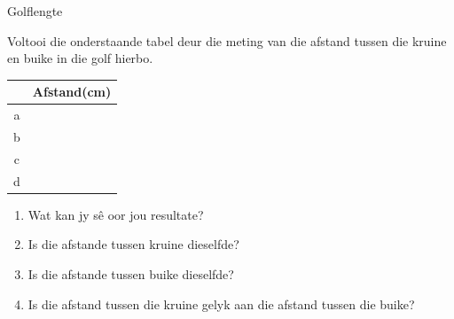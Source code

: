 \noindent
\label{m38806*secfhsst!!!underscore!!!id221}
            \begin{activity}{Golflengte}
            \nopagebreak
        \label{m38806*id318517}
    \setcounter{subfigure}{0}
	\begin{figure}[H] %
    \begin{center}
\end{center} \end{figure}       
        \par 
Voltooi die onderstaande tabel deur die meting van die afstand tussen die kruine en buike in die
       golf hierbo.
\begin{center}
\begin{tabular}{|c|c|}\hline
&Afstand(cm)\\\hline
a&\\\hline
b&\\\hline
c&\\\hline
d&\\\hline
\end{tabular}
\end{center}
    \par
        \label{m38806*id318631}\begin{enumerate}[noitemsep, label=\textbf{\arabic*}. ] 
            \label{m38806*uid15}\item Wat kan jy s\^{e} oor jou resultate?
\label{m38806*uid16}\item Is die afstande tussen kruine dieselfde?
\label{m38806*uid17}\item Is die afstande tussen buike dieselfde?
\label{m38806*uid18}\item Is die afstand tussen die kruine gelyk aan die afstand tussen die buike?
\end{enumerate}

\end{activity}

